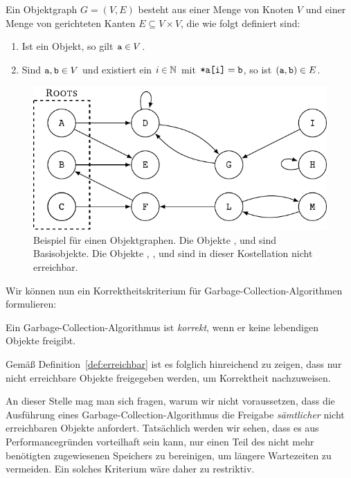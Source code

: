\begin{mybox}
\begin{defn}[Objektgraph]
	Ein Objektgraph $G = (V,E)$ besteht aus einer Menge von Knoten $V$ und einer Menge von gerichteten Kanten $E \subseteq V \times V$, die wie folgt definiert sind:
	\begin{enumerate}[(1)]
		\item Ist  ein Objekt, so gilt $\texttt{a} \in V$.
		\item Sind $\texttt{a}, \texttt{b} \in V$ und existiert ein $i \in \mathbb{N}$ mit $\texttt{*a[i]} = \texttt{b}$, so ist $(\texttt{a},\texttt{b}) \in E$.
	\end{enumerate}
\end{defn}
\end{mybox}

\begin{figure}[h]
	\centering
	\includegraphics[keepaspectratio]{img/tikz/ch1-objgraph.pdf}
	\caption[Beispiel für einen Objektgraphen]{Beispiel für einen Objektgraphen. Die Objekte ,  und  sind Basisobjekte. Die Objekte , ,  und  sind in dieser Kostellation nicht erreichbar.}
\end{figure}

Wir können nun ein Korrektheitskriterium für Garbage-Collection-Algorithmen formulieren:

\begin{mybox}
\begin{defn}
	Ein Garbage-Collection-Algorithmus ist \textit{korrekt}, wenn er keine lebendigen Objekte freigibt.
\end{defn}
\end{mybox}

Gemäß Definition~\ref{def:erreichbar} ist es folglich hinreichend zu zeigen, dass nur nicht erreichbare Objekte freigegeben werden, um Korrektheit nachzuweisen.

An dieser Stelle mag man sich fragen, warum wir nicht voraussetzen, dass die Ausführung eines Garbage-Collection-Algorithmus die Freigabe \textit{sämtlicher} nicht erreichbaren Objekte anfordert.
Tatsächlich werden wir sehen, dass es aus Performancegründen vorteilhaft sein kann, nur einen Teil des nicht mehr benötigten zugewiesenen Speichers zu bereinigen, um längere Wartezeiten zu vermeiden.
Ein solches Kriterium wäre daher zu restriktiv.